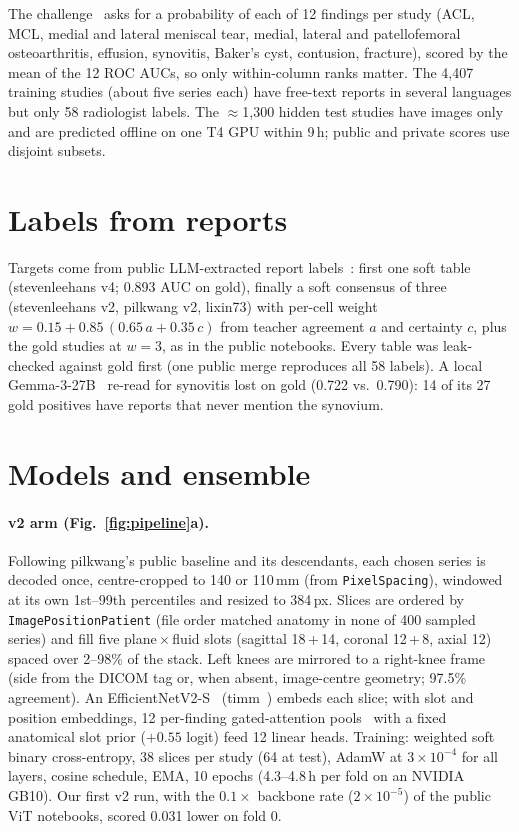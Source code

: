 \documentclass[10pt,twocolumn]{article}
\begin{document}
The challenge~\cite{rsna} asks for a probability of each of 12 findings per study (ACL, MCL, medial and lateral
meniscal tear, medial, lateral and patellofemoral osteoarthritis, effusion, synovitis, Baker's cyst, contusion,
fracture), scored by the mean of the 12 ROC AUCs, so only within-column ranks matter. The 4,407 training studies
(about five series each) have free-text reports in several languages but only 58 radiologist labels. The
$\approx$1,300 hidden test studies have images only and are predicted offline on one T4 GPU within 9\,h; public and
private scores use disjoint subsets.

\section{Labels from reports}

Targets come from public LLM-extracted report labels~\cite{labels}: first one soft table (stevenleehans v4; 0.893
AUC on gold), finally a soft consensus of three (stevenleehans v2, pilkwang v2, lixin73) with per-cell weight
$w=0.15+0.85\,(0.65\,a+0.35\,c)$ from teacher agreement $a$ and certainty $c$, plus the gold studies at $w=3$, as in
the public notebooks. Every table was leak-checked against gold first (one public merge reproduces all 58 labels). A
local Gemma-3-27B~\cite{gemma} re-read for synovitis lost on gold (0.722 vs.\ 0.790): 14 of its 27 gold positives
have reports that never mention the synovium.

\section{Models and ensemble}

\paragraph{v2 arm (Fig.~\ref{fig:pipeline}a).} Following pilkwang's public baseline and its descendants, each chosen
series is decoded once, centre-cropped to 140 or 110\,mm (from \texttt{PixelSpacing}), windowed at its own
1st--99th percentiles and resized to 384\,px. Slices are ordered by \texttt{ImagePositionPatient} (file order matched
anatomy in none of 400 sampled series) and fill five plane\,$\times$\,fluid slots (sagittal 18\,+\,14, coronal
12\,+\,8, axial 12) spaced over 2--98\% of the stack. Left knees are mirrored to a right-knee frame (side from the
DICOM tag or, when absent, image-centre geometry; 97.5\% agreement). An
EfficientNetV2-S~\cite{effnetv2} (timm~\cite{timm}) embeds each slice; with slot and position embeddings, 12
per-finding gated-attention pools~\cite{ilse} with a fixed anatomical slot prior ($+0.55$ logit) feed 12 linear
heads. Training: weighted soft binary cross-entropy, 38 slices per study (64 at test), AdamW at $3{\times}10^{-4}$ for all
layers, cosine schedule, EMA, 10 epochs (4.3--4.8\,h per fold on an NVIDIA GB10). Our first v2 run, with the
$0.1\times$ backbone rate ($2{\times}10^{-5}$) of the public ViT notebooks, scored 0.031 lower on fold 0.
\end{document}
